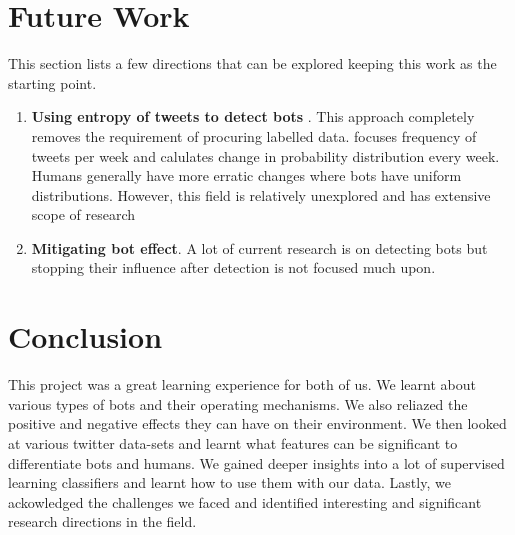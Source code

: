 \documentclass[journal]{IEEEtran}
\begin{document}
\section{Future Work}
This section lists a few directions that can be explored keeping this work as the starting point.
\begin{enumerate}
	\item \textbf{Using entropy of tweets to detect bots} \cite{Entropy}. This approach completely removes the requirement of procuring labelled data. \cite{Entropy} focuses frequency of tweets per week and calulates change in probability distribution every week. Humans generally have more erratic changes where bots have uniform distributions. However, this field is relatively unexplored and has extensive scope of research
	\item \textbf{Mitigating bot effect}. A lot of current research is on detecting bots but stopping their influence after detection is not focused much upon. 
\end{enumerate}

\section{Conclusion}
This project was a great learning experience for both of us. We learnt about various types of bots and their operating mechanisms. We also reliazed the positive and negative effects they can have on their environment. We then looked at various twitter data-sets and learnt what features can be significant to differentiate bots and humans. We gained deeper insights into a lot of supervised learning classifiers and learnt how to use them with our data. Lastly, we ackowledged the challenges we faced and identified interesting and significant research directions in the field.


\end{document}
